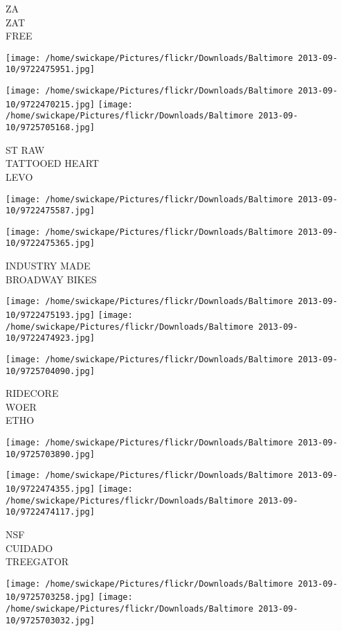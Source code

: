 \documentclass[10pt,letterpaper]{article}
\begin{document}
ZA\\
ZAT\\
FREE
\pagebreak

\texttt{[image: /home/swickape/Pictures/flickr/Downloads/Baltimore 2013-09-10/9722475951.jpg]}

\vspace{0.25in}
\texttt{[image: /home/swickape/Pictures/flickr/Downloads/Baltimore 2013-09-10/9722470215.jpg]}
\texttt{[image: /home/swickape/Pictures/flickr/Downloads/Baltimore 2013-09-10/9725705168.jpg]}

ST RAW\\
TATTOOED HEART\\
LEVO
\pagebreak

\texttt{[image: /home/swickape/Pictures/flickr/Downloads/Baltimore 2013-09-10/9722475587.jpg]}

\vspace{0.25in}
\texttt{[image: /home/swickape/Pictures/flickr/Downloads/Baltimore 2013-09-10/9722475365.jpg]}

INDUSTRY MADE\\
BROADWAY BIKES
\pagebreak

\texttt{[image: /home/swickape/Pictures/flickr/Downloads/Baltimore 2013-09-10/9722475193.jpg]}
\texttt{[image: /home/swickape/Pictures/flickr/Downloads/Baltimore 2013-09-10/9722474923.jpg]}

\texttt{[image: /home/swickape/Pictures/flickr/Downloads/Baltimore 2013-09-10/9725704090.jpg]}

RIDECORE\\
WOER\\
ETHO
\pagebreak

\texttt{[image: /home/swickape/Pictures/flickr/Downloads/Baltimore 2013-09-10/9725703890.jpg]}

\vspace{0.25in}
\texttt{[image: /home/swickape/Pictures/flickr/Downloads/Baltimore 2013-09-10/9722474355.jpg]}
\texttt{[image: /home/swickape/Pictures/flickr/Downloads/Baltimore 2013-09-10/9722474117.jpg]}

NSF\\
CUIDADO\\
TREEGATOR
\pagebreak

\texttt{[image: /home/swickape/Pictures/flickr/Downloads/Baltimore 2013-09-10/9725703258.jpg]}
\texttt{[image: /home/swickape/Pictures/flickr/Downloads/Baltimore 2013-09-10/9725703032.jpg]}
\end{document}
